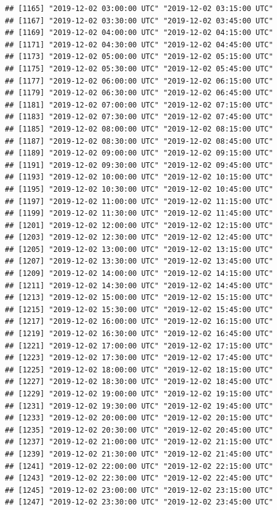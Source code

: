 \documentclass{article}\usepackage[]{graphicx}\usepackage[]{color}
\makeatletter
\newenvironment{kframe}{%
 \def\at@end@of@kframe{}%
 \ifinner\ifhmode%
  \def\at@end@of@kframe{\end{minipage}}%
  \begin{minipage}{\columnwidth}%
 \fi\fi%
 \def\FrameCommand##1{\hskip\@totalleftmargin \hskip-\fboxsep
 \colorbox{shadecolor}{##1}\hskip-\fboxsep
     \hskip-\linewidth \hskip-\@totalleftmargin \hskip\columnwidth}%
 \MakeFramed {\advance\hsize-\width
   \@totalleftmargin\z@ \linewidth\hsize
   \@setminipage}}%
 {\par\unskip\endMakeFramed%
 \at@end@of@kframe}
\newenvironment{knitrout}{}{} %
\makeatother
\begin{document}
\begin{knitrout}
\begin{kframe}
\begin{verbatim}
## [1165] "2019-12-02 03:00:00 UTC" "2019-12-02 03:15:00 UTC"
## [1167] "2019-12-02 03:30:00 UTC" "2019-12-02 03:45:00 UTC"
## [1169] "2019-12-02 04:00:00 UTC" "2019-12-02 04:15:00 UTC"
## [1171] "2019-12-02 04:30:00 UTC" "2019-12-02 04:45:00 UTC"
## [1173] "2019-12-02 05:00:00 UTC" "2019-12-02 05:15:00 UTC"
## [1175] "2019-12-02 05:30:00 UTC" "2019-12-02 05:45:00 UTC"
## [1177] "2019-12-02 06:00:00 UTC" "2019-12-02 06:15:00 UTC"
## [1179] "2019-12-02 06:30:00 UTC" "2019-12-02 06:45:00 UTC"
## [1181] "2019-12-02 07:00:00 UTC" "2019-12-02 07:15:00 UTC"
## [1183] "2019-12-02 07:30:00 UTC" "2019-12-02 07:45:00 UTC"
## [1185] "2019-12-02 08:00:00 UTC" "2019-12-02 08:15:00 UTC"
## [1187] "2019-12-02 08:30:00 UTC" "2019-12-02 08:45:00 UTC"
## [1189] "2019-12-02 09:00:00 UTC" "2019-12-02 09:15:00 UTC"
## [1191] "2019-12-02 09:30:00 UTC" "2019-12-02 09:45:00 UTC"
## [1193] "2019-12-02 10:00:00 UTC" "2019-12-02 10:15:00 UTC"
## [1195] "2019-12-02 10:30:00 UTC" "2019-12-02 10:45:00 UTC"
## [1197] "2019-12-02 11:00:00 UTC" "2019-12-02 11:15:00 UTC"
## [1199] "2019-12-02 11:30:00 UTC" "2019-12-02 11:45:00 UTC"
## [1201] "2019-12-02 12:00:00 UTC" "2019-12-02 12:15:00 UTC"
## [1203] "2019-12-02 12:30:00 UTC" "2019-12-02 12:45:00 UTC"
## [1205] "2019-12-02 13:00:00 UTC" "2019-12-02 13:15:00 UTC"
## [1207] "2019-12-02 13:30:00 UTC" "2019-12-02 13:45:00 UTC"
## [1209] "2019-12-02 14:00:00 UTC" "2019-12-02 14:15:00 UTC"
## [1211] "2019-12-02 14:30:00 UTC" "2019-12-02 14:45:00 UTC"
## [1213] "2019-12-02 15:00:00 UTC" "2019-12-02 15:15:00 UTC"
## [1215] "2019-12-02 15:30:00 UTC" "2019-12-02 15:45:00 UTC"
## [1217] "2019-12-02 16:00:00 UTC" "2019-12-02 16:15:00 UTC"
## [1219] "2019-12-02 16:30:00 UTC" "2019-12-02 16:45:00 UTC"
## [1221] "2019-12-02 17:00:00 UTC" "2019-12-02 17:15:00 UTC"
## [1223] "2019-12-02 17:30:00 UTC" "2019-12-02 17:45:00 UTC"
## [1225] "2019-12-02 18:00:00 UTC" "2019-12-02 18:15:00 UTC"
## [1227] "2019-12-02 18:30:00 UTC" "2019-12-02 18:45:00 UTC"
## [1229] "2019-12-02 19:00:00 UTC" "2019-12-02 19:15:00 UTC"
## [1231] "2019-12-02 19:30:00 UTC" "2019-12-02 19:45:00 UTC"
## [1233] "2019-12-02 20:00:00 UTC" "2019-12-02 20:15:00 UTC"
## [1235] "2019-12-02 20:30:00 UTC" "2019-12-02 20:45:00 UTC"
## [1237] "2019-12-02 21:00:00 UTC" "2019-12-02 21:15:00 UTC"
## [1239] "2019-12-02 21:30:00 UTC" "2019-12-02 21:45:00 UTC"
## [1241] "2019-12-02 22:00:00 UTC" "2019-12-02 22:15:00 UTC"
## [1243] "2019-12-02 22:30:00 UTC" "2019-12-02 22:45:00 UTC"
## [1245] "2019-12-02 23:00:00 UTC" "2019-12-02 23:15:00 UTC"
## [1247] "2019-12-02 23:30:00 UTC" "2019-12-02 23:45:00 UTC"

\end{verbatim}
\end{kframe}
\end{knitrout}
\end{document}
